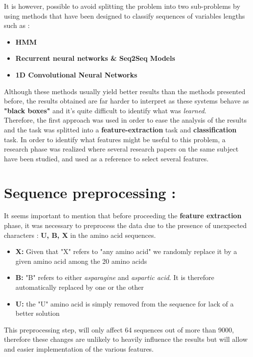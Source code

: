 \documentclass{bioinfo}
\begin{document}
It is however, possible to avoid splitting the problem into two sub-problems by using methods that have been designed to classify sequences of variables lengths such as :\\
\begin{itemize}
	\item \textbf{HMM} 
	\item \textbf{Recurrent neural networks \& Seq2Seq Models}
	\item \textbf{1D Convolutional Neural Networks}
\end{itemize}

Although these methods usually yield better results than the methods presented before, the results obtained are far harder to interpret as these systems behave as \textbf{"black boxes"} and it's quite difficult to identify what was \textit{learned}. \\

Therefore, the first approach was used in order to ease the analysis of the results and the task was splitted into a \textbf{feature-extraction} task and \textbf{classification} task. In order to identify what features might be useful to this problem, a research phase was realized where several research papers on the same subject have been studied, and used as a reference to select several features. 

\section{Sequence preprocessing : }
It seems important to mention that before proceeding the \textbf{feature extraction} phase, it was necessary to preprocess the data due to the presence of unexpected characters : \textbf{U, B, X} in the amino acid sequences. 

\begin{itemize}
	\item \textbf{X: } Given that "X" refers to "any amino acid" we randomly replace it by a given amino acid among the 20 amino acids
	\item \textbf{B: } "B" refers to either \textit{asparagine} and \textit{aspartic acid}. It is therefore automatically replaced by one or the other
	\item \textbf{U: } the "U" amino acid is simply removed from the sequence for lack of a better solution

\end{itemize}
 
 This preprocessing step, will only affect 64 sequences out of more than 9000, therefore these changes are unlikely to heavily influence the results but will allow and easier implementation of the various features.
\end{document}
